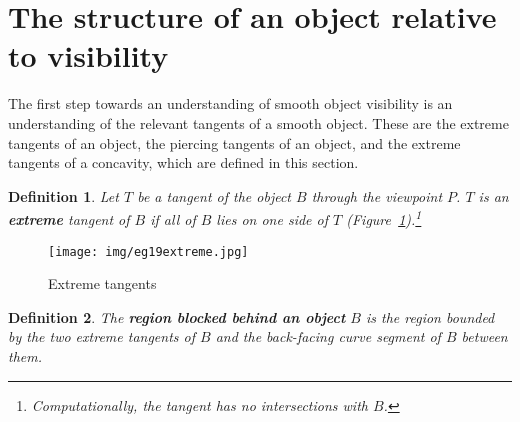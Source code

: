 \documentclass[10pt,twocolumn]{article}
\newcommand{\Comment}[1]{\relax}  %
\newtheorem{defn2}{Definition}
\begin{document}
\Comment{
The study of silhouettes is relevant to visibility, since visual events
occur at silhouettes, and here there has been work with smooth objects, 
such as subdivision surfaces \cite{zorin00}.
}

 

\section{The structure of an object relative to visibility}
\label{sec:structure}

The first step towards an understanding of smooth object visibility is an understanding
of the relevant tangents of a smooth object.
These are the extreme tangents of an object,
the piercing tangents of an object,
and the extreme tangents of a concavity, which are defined in this section.


\begin{defn2}
Let $T$ be a tangent of the object $B$ through the viewpoint $P$.
$T$ is an {\bf extreme} tangent of $B$ if all of $B$ lies on one side of $T$
(Figure~\ref{fig:extreme}).\footnote{Computationally, 
  the tangent has no intersections with $B$.}
\end{defn2}

\begin{figure}[h]
\begin{center}
\texttt{[image: img/eg19extreme.jpg]}
\end{center}
\caption{Extreme tangents}
\label{fig:extreme}
\end{figure}

\begin{defn2}
\label{defn:behind}
The {\bf region blocked behind an object} $B$ is the region bounded by 
the two extreme tangents of $B$ and the back-facing curve segment of $B$ between them.
\end{defn2}
\end{document}
